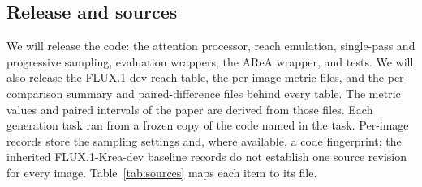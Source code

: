 \subsection{Release and sources}
\label{app:release}

We will release the code: the attention processor, reach emulation, single-pass and progressive sampling, evaluation wrappers, the AReA wrapper, and tests. We will also release the FLUX.1-dev reach table, the per-image metric files, and the per-comparison summary and paired-difference files behind every table. The metric values and paired intervals of the paper are derived from those files. Each \sca{} generation task ran from a frozen copy of the code named in the task. Per-image records store the sampling settings and, where available, a code fingerprint; the inherited FLUX.1-Krea-dev baseline records do not establish one source revision for every image. Table~\ref{tab:sources} maps each item to its file.

